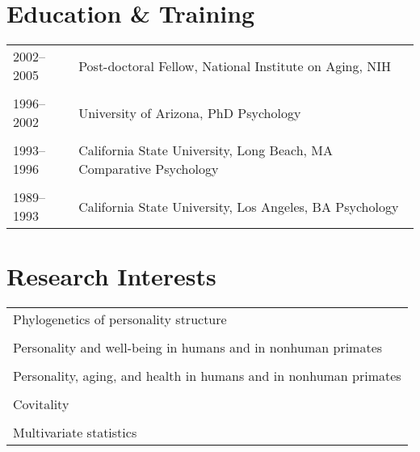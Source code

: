\documentclass[11pt]{article}
\begin{document}
\section*{Education \& Training}

\begin{tabular}{p{3cm}p{12cm}}
2002--2005 & Post-doctoral Fellow, National Institute on Aging, NIH
\\ \\

1996--2002 & University of Arizona, PhD Psychology
\\ \\

1993--1996 & California State University, Long Beach, MA Comparative
Psychology \\ \\

1989--1993 & California State University, Los Angeles, BA Psychology
\end{tabular}

\section*{Research Interests}
\begin{tabular}{p{15cm}}

Phylogenetics of personality structure \\ \\

Personality and well-being in humans and in nonhuman primates \\ \\

Personality, aging, and health in humans and in nonhuman
        primates \\ \\

Covitality \\ \\
        
Multivariate statistics

\end{tabular}
\end{document}
